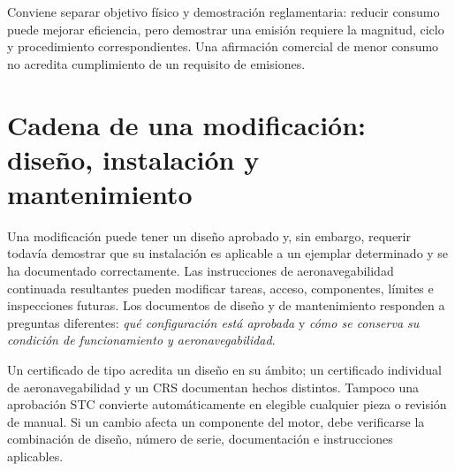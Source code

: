 Conviene separar objetivo físico y demostración reglamentaria: reducir consumo puede mejorar eficiencia, pero demostrar una emisión requiere la magnitud, ciclo y procedimiento correspondientes. Una afirmación comercial de menor consumo no acredita cumplimiento de un requisito de emisiones.
\section{Cadena de una modificación: diseño, instalación y mantenimiento}
Una modificación puede tener un diseño aprobado y, sin embargo, requerir todavía demostrar que su instalación es aplicable a un ejemplar determinado y se ha documentado correctamente. Las instrucciones de aeronavegabilidad continuada resultantes pueden modificar tareas, acceso, componentes, límites e inspecciones futuras. Los documentos de diseño y de mantenimiento responden a preguntas diferentes: \emph{qué configuración está aprobada} y \emph{cómo se conserva su condición de funcionamiento y aeronavegabilidad}.

Un certificado de tipo acredita un diseño en su ámbito; un certificado individual de aeronavegabilidad y un CRS documentan hechos distintos. Tampoco una aprobación STC convierte automáticamente en elegible cualquier pieza o revisión de manual. Si un cambio afecta un componente del motor, debe verificarse la combinación de diseño, número de serie, documentación e instrucciones aplicables.


